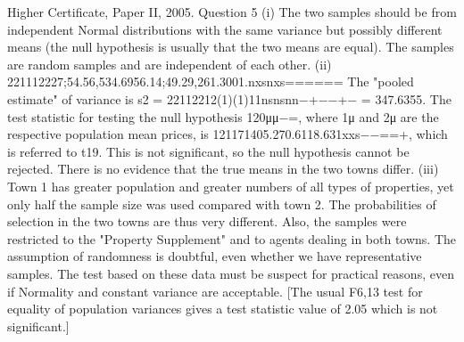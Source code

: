 Higher Certificate, Paper II, 2005. Question 5
(i) The two samples should be from independent Normal distributions with the same variance but possibly different means (the null hypothesis is usually that the two means are equal). The samples are random samples and are independent of each other.
(ii)
221112227;54.56,534.6956.14;49.29,261.3001.nxsnxs======
The "pooled estimate" of variance is s2 = 22112212(1)(1)11nsnsnn−+−−+− = 347.6355.
The test statistic for testing the null hypothesis 120μμ−=, where 1μ and 2μ are the respective population mean prices, is
121171405.270.6118.631xxs−−==+,
which is referred to t19. This is not significant, so the null hypothesis cannot be rejected. There is no evidence that the true means in the two towns differ.
(iii) Town 1 has greater population and greater numbers of all types of properties, yet only half the sample size was used compared with town 2. The probabilities of selection in the two towns are thus very different. Also, the samples were restricted to the "Property Supplement" and to agents dealing in both towns. The assumption of randomness is doubtful, even whether we have representative samples. The test based on these data must be suspect for practical reasons, even if Normality and constant variance are acceptable. [The usual F6,13 test for equality of population variances gives a test statistic value of 2.05 which is not significant.]
